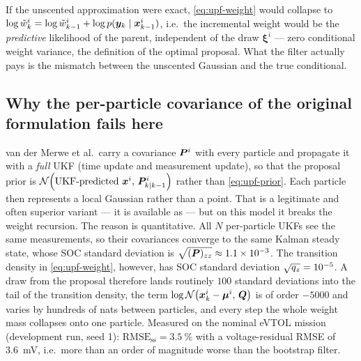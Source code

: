 If the unscented approximation were exact, \eqref{eq:upf-weight} would collapse to
$\log\tilde w^i_k = \log\tilde w^i_{k-1} + \log p(\bm{y}_k\mid\bm{x}^i_{k-1})$, i.e.\ the incremental
weight would be the \emph{predictive} likelihood of the parent, independent of the draw
$\bm\xi^i$ --- zero conditional weight variance, the definition of the optimal proposal.  What the
filter actually pays is the mismatch between the unscented Gaussian and the true conditional.

\subsection{Why the per-particle covariance of the original formulation fails here}
van der Merwe et al.\ carry a covariance $\bm{P}^i$ with every particle and propagate it with a
\emph{full} UKF (time update and measurement update), so that the proposal prior is
$\mathcal{N}\!\left(\text{UKF-predicted }\bm{x}^i,\,\bm{P}^i_{k|k-1}\right)$ rather than \eqref{eq:upf-prior}.  Each particle
then represents a local Gaussian rather than a point.  That is a legitimate and often superior
variant --- it is available as  --- but on this model it breaks
the weight recursion.  The reason is quantitative.  All $N$ per-particle UKFs see the same
measurements, so their covariances converge to the same Kalman steady state, whose SOC standard
deviation is $\sqrt{(\bm{P})_{zz}} \approx 1.1\times10^{-3}$.  The transition density in
\eqref{eq:upf-weight}, however, has SOC standard deviation
$\sqrt{q_{z}} = 10^{-5}$.  A draw from the proposal therefore lands routinely $100$ standard
deviations into the tail of the transition density, the term
$\log\mathcal{N}\!\left(\bm{x}^i_k-\bm\mu^i,\,\bm{Q}\right)$ is of order $-5000$ and varies by hundreds of nats between
particles, and every step the whole weight mass collapses onto one particle.  Measured on the
nominal eVTOL mission (development run, seed 1): $\mathrm{RMSE}_{\mathrm{ss}} =
\SI{3.5}{\percent}$ with a voltage-residual RMSE of \SI{3.6}{\milli\volt}, i.e.\ more than an order
of magnitude worse than the bootstrap filter.

